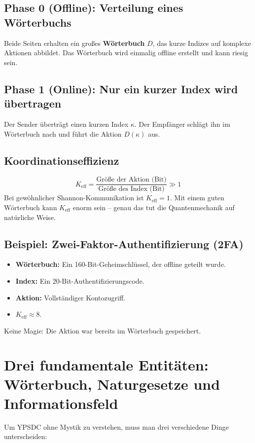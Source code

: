 \documentclass[12pt,a4paper]{article}
\begin{document}
	\subsection{Phase 0 (Offline): Verteilung eines Wörterbuchs}
	Beide Seiten erhalten ein großes \textbf{Wörterbuch} \(D\), das kurze Indizes auf komplexe Aktionen abbildet. Das Wörterbuch wird einmalig offline erstellt und kann riesig sein.
	
	\subsection{Phase 1 (Online): Nur ein kurzer Index wird übertragen}
	Der Sender überträgt einen kurzen Index \(\kappa\). Der Empfänger schlägt ihn im Wörterbuch nach und führt die Aktion \(D(\kappa)\) aus.
	
	\subsection{Koordinationseffizienz}
	\[
	K_{\mathrm{eff}} = \frac{\text{Größe der Aktion (Bit)}}{\text{Größe des Index (Bit)}} \gg 1
	\]
	Bei gewöhnlicher Shannon-Kommunikation ist \(K_{\mathrm{eff}}=1\). Mit einem guten Wörterbuch kann \(K_{\mathrm{eff}}\) enorm sein – genau das tut die Quantenmechanik auf natürliche Weise.
	
	\subsection{Beispiel: Zwei-Faktor-Authentifizierung (2FA)}
	\begin{itemize}
		\item \textbf{Wörterbuch:} Ein 160-Bit-Geheimschlüssel, der offline geteilt wurde.
		\item \textbf{Index:} Ein 20-Bit-Authentifizierungscode.
		\item \textbf{Aktion:} Vollständiger Kontozugriff.
		\item \(K_{\mathrm{eff}} \approx 8\).
	\end{itemize}
	Keine Magie: Die Aktion war bereits im Wörterbuch gespeichert.
	
	\section{Drei fundamentale Entitäten: Wörterbuch, Naturgesetze und Informationsfeld}
	Um YPSDC ohne Mystik zu verstehen, muss man drei verschiedene Dinge unterscheiden:
	
\end{document}

